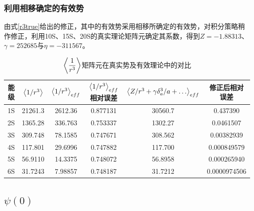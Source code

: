 \documentclass[hyperref,cs4size,titlepage,twoside]{ctexart}
\begin{document}
\subsubsection{利用相移确定的有效势}
由式\eqref{r3true}给出的修正，其中的有效势采用相移所确定的有效势，对积分策略稍作修正，利用10S、15S、20S的真实理论矩阵元确定其系数，得到$Z=-1.88313$、$\gamma=252685$与$\eta=-311567$。
\begin{table}[!hbtp]
  \centering
  \begin{tabular}{|cccccc|}
    \hline
    能级 & $\expval{1/r^3}$ & $\expval{1/r^3}_{eff}$ & $\expval{1/r^3}_{eff}$ 相对误差& $\expval{Z/r^3+\gamma \delta^3_a/a+\dots}_{eff}$ & 修正后相对误差 \\
    \hline
    1S & 21261.3 & 2612.36 &0.877131& 30560.7&0.437390 \\
    2S & 1365.28 & 336.763 &0.753337& 1302.27&0.0461507 \\
    3S & 309.748 & 78.1585 &0.747671& 308.562&0.00382939 \\
    4S & 117.801 & 29.6996 &0.747882& 117.700&0.000849579 \\
    5S & 56.9110 & 14.3375 &0.748072& 56.8958&0.000265940 \\
    6S & 31.7243 & 7.98857 &0.748187& 31.7212&0.0000974506 \\
    \hline
  \end{tabular}
  \caption{$\displaystyle\expval{\frac{1}{r^3}}$矩阵元在真实势及有效理论中的对比}\label{evr31}
\end{table}
\subsection{$\psi(0)$}
\end{document}
